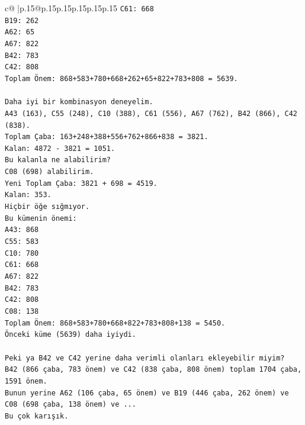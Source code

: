 \documentclass{article}
\begin{document}
{\begin{supertabular}{c@{$\;$}|p{.15\linewidth}@{}p{.15\linewidth}p{.15\linewidth}p{.15\linewidth}p{.15\linewidth}p{.15\linewidth}}
{{{\texttt{C61: 668} \\
\texttt{B19: 262} \\
\texttt{A62: 65} \\
\texttt{A67: 822} \\
\texttt{B42: 783} \\
\texttt{C42: 808} \\
\texttt{Toplam Önem: 868+583+780+668+262+65+822+783+808 = 5639.} \\
\\ 
\texttt{Daha iyi bir kombinasyon deneyelim.} \\
\texttt{A43 (163), C55 (248), C10 (388), C61 (556), A67 (762), B42 (866), C42 (838).} \\
\texttt{Toplam Çaba: 163+248+388+556+762+866+838 = 3821.} \\
\texttt{Kalan: 4872 {-} 3821 = 1051.} \\
\texttt{Bu kalanla ne alabilirim?} \\
\texttt{C08 (698) alabilirim.} \\
\texttt{Yeni Toplam Çaba: 3821 + 698 = 4519.} \\
\texttt{Kalan: 353.} \\
\texttt{Hiçbir öğe sığmıyor.} \\
\texttt{Bu kümenin önemi:} \\
\texttt{A43: 868} \\
\texttt{C55: 583} \\
\texttt{C10: 780} \\
\texttt{C61: 668} \\
\texttt{A67: 822} \\
\texttt{B42: 783} \\
\texttt{C42: 808} \\
\texttt{C08: 138} \\
\texttt{Toplam Önem: 868+583+780+668+822+783+808+138 = 5450.} \\
\texttt{Önceki küme (5639) daha iyiydi.} \\
\\ 
\texttt{Peki ya B42 ve C42 yerine daha verimli olanları ekleyebilir miyim?} \\
\texttt{B42 (866 çaba, 783 önem) ve C42 (838 çaba, 808 önem) toplam 1704 çaba, 1591 önem.} \\
\texttt{Bunun yerine A62 (106 çaba, 65 önem) ve B19 (446 çaba, 262 önem) ve C08 (698 çaba, 138 önem) ve ...} \\
\texttt{Bu çok karışık.} \\
\\ 
}}}
\end{supertabular}}
\end{document}
